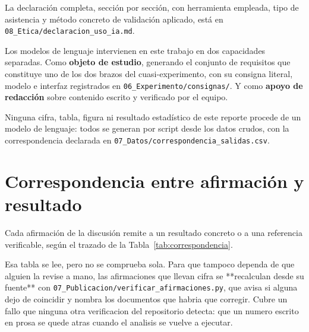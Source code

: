 \documentclass[11pt,a4paper]{article}
\begin{document}
La declaraci\'on completa, secci\'on por secci\'on, con herramienta empleada, tipo de
asistencia y m\'etodo concreto de validaci\'on aplicado, est\'a en
\texttt{08\_Etica/declaracion\_uso\_ia.md}.

Los modelos de lenguaje intervienen en este trabajo en dos capacidades separadas. Como
\textbf{objeto de estudio}, generando el conjunto de requisitos que constituye uno de
los dos brazos del cuasi-experimento, con su consigna literal, modelo e interfaz
registrados en \texttt{06\_Experimento/consignas/}. Y como \textbf{apoyo de redacci\'on}
sobre contenido escrito y verificado por el equipo.

Ninguna cifra, tabla, figura ni resultado estad\'istico de este reporte procede de un
modelo de lenguaje: todos se generan por script desde los datos crudos, con la
correspondencia declarada en \texttt{07\_Datos/correspondencia\_salidas.csv}.

\section{Correspondencia entre afirmaci\'on y resultado}
\label{anx:correspondencia}

Cada afirmaci\'on de la discusi\'on remite a un resultado concreto o a una referencia
verificable, seg\'un el trazado de la Tabla~\ref{tab:correspondencia}.

Esa tabla se lee, pero no se comprueba sola. Para que tampoco dependa de que alguien la
revise a mano, las afirmaciones que llevan cifra se **recalculan desde su fuente** con
\texttt{07\_Publicacion/verificar\_afirmaciones.py}, que avisa si alguna dejo de coincidir y
nombra los documentos que habria que corregir. Cubre un fallo que ninguna otra verificacion
del repositorio detecta: que un numero escrito en prosa se quede atras cuando el analisis se
vuelve a ejecutar.
\end{document}
